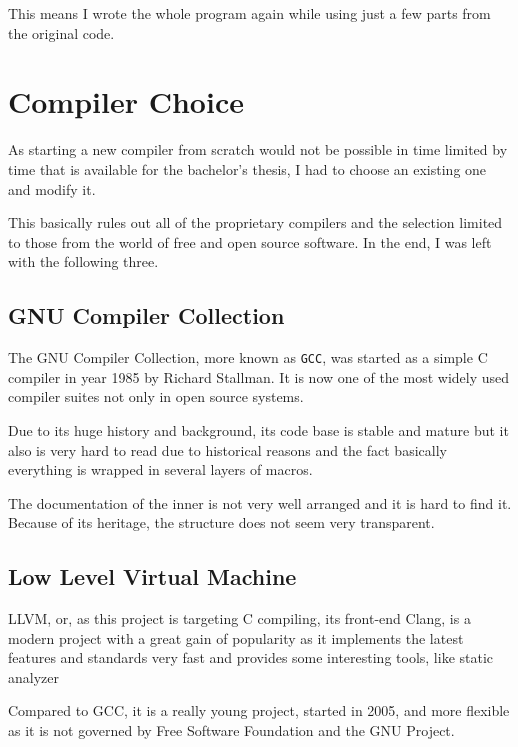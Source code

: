     This means I wrote the whole program again while using just a few parts from the original code.

\chapter{Compiler Choice}\label{compiler}

As starting a new compiler from scratch would not be possible in time limited by time that is available for the bachelor's thesis, I had to choose an existing one and modify it.

This basically rules out all of the proprietary compilers and the selection limited to those from the world of free and open source software. In the end, I was left with the following three.


    \section{GNU Compiler Collection}

    The GNU Compiler Collection, more known as \texttt{GCC}, was started as a simple C compiler in year 1985 by Richard Stallman. It is now one of the most widely used compiler suites not only in open source systems.

    Due to its huge history and background, its code base is stable and mature but it also is very hard to read due to historical reasons and the fact basically everything is wrapped in several layers of macros.

    The documentation of the inner %
    is not very well arranged and it is hard to find it. Because of its heritage, the structure does not seem very transparent.

    \section{Low Level Virtual Machine}

    LLVM, or, as this project is targeting C compiling, its front-end Clang, is a modern project with a great gain of popularity as it implements the latest features and standards very fast and provides some interesting tools, like static analyzer

    Compared to GCC, it is a really young project, started in 2005, and more flexible as it is not governed by Free Software Foundation and the GNU Project.

